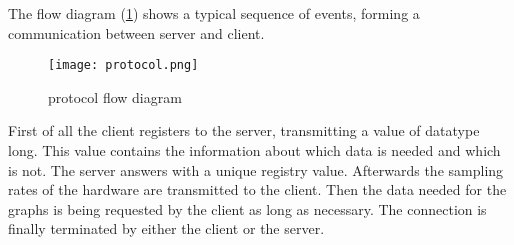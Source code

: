 The flow diagram (\ref{fig:protocol}) shows a typical sequence of events, forming a communication between server and client.
\begin{center}
\begin{figure}[t!]
	\begin{center}
		\texttt{[image: protocol.png]} 
		\caption{protocol flow diagram}
		\label{fig:protocol}
	\end{center}
\end{figure}
\end{center}
First of all the client registers to the server, transmitting a value of datatype long. This value contains the information about which data is needed and which is not. The server answers with a unique registry value.\newline
Afterwards the sampling rates of the hardware are transmitted to the client.\newline
Then the data needed for the graphs is being requested by the client as long as necessary.\newline
The connection is finally terminated by either the client or the server.\newline

